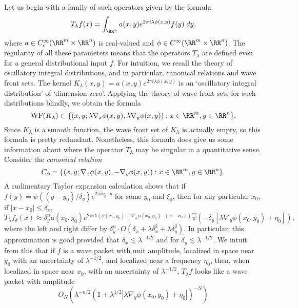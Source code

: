 Let us begin with a family of such operators given by the formula
%
\[ T_\lambda f(x) = \int_{\RR^n} a(x,y) e^{2 \pi i \lambda \phi(x,y)} f(y)\; dy, \]
%
where $a \in C_c^\infty(\RR^m \times \RR^n)$ is real-valued and $\phi \in C^\infty(\RR^m \times \RR^n)$. The regularity of all these parameters means that the operators $T_\lambda$ are defined even for a general distributional input $f$. For intuition, we recall the theory of oscillatory integral distributions, and in particular, canonical relations and wave front sets. The kernel $K_\lambda(x,y) = a(x,y) e^{2 \pi i \lambda \phi(x,y)}$ is an `oscillatory integral distribution' of `dimension zero'. Applying the theory of wave front sets for such distributions blindly, we obtain the formula
%
\[ \text{WF}(K_\lambda) \subset \{ (x,y; \lambda \nabla_x \phi(x,y), \lambda \nabla_y \phi(x,y)) : x \in \RR^m, y \in \RR^n \}. \]
%
Since $K_\lambda$ is a smooth function, the wave front set of $K_\lambda$ is actually empty, so this formula is pretty redundant. Nonetheless, this formula does give us some information about where the operator $T_\lambda$ may be singular in a quantitative sense. Consider the \emph{canonical relation}
%
\[ C_\phi = \{  (x,y; \nabla_x \phi(x,y), - \nabla_y \phi(x,y) ) : x \in \RR^m, y \in \RR^n \}. \]
%
A rudimentary Taylor expansion calculation shows that if $f(y) = \psi((y - y_0)/\delta_y) e^{2 \pi i \eta_0 \cdot y}$ for some $y_0$ and $\xi_0$, then for any particular $x_0$, if $|x - x_0| \leq \delta_x$,
%
\[ T_\lambda f_\delta(x) \approx \delta_y^n a(x_0,y_0) e^{2 \pi i \lambda(\phi(x_0,y_0) + \nabla_x \phi(x_0,y_0) \cdot (x - x_0))} \widehat{\psi}(- \delta_y [\lambda \nabla_y \phi(x_0,y_0) + \eta_0]), \]
%
where the left and right differ by $\delta_y^n \cdot O(\delta_x + \lambda \delta_x^2 + \lambda \delta_y^2)$. In particular, this approximation is good provided that $\delta_x \lesssim \lambda^{-1/2}$ and for $\delta_y \lesssim \lambda^{-1/2}$. We intuit from this that if $f$ is a wave packet with unit amplitude, localized in space near $y_0$ with an uncertainty of $\lambda^{-1/2}$, and localized near a frequency $\eta_0$, then, when localized in space near $x_0$, with an uncertainty of $\lambda^{-1/2}$, $T_\lambda f$ looks like a wave packet with amplitude
%
\[ O_N(\lambda^{-n/2} (1 + \lambda^{1/2} |\lambda \nabla_y \phi(x_0,y_0) + \eta_0 |)^{-N} ) \]
%
